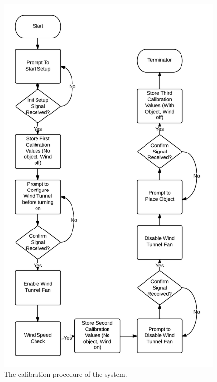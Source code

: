 	\begin{figure}[H]
		\centering
			\includegraphics[scale=0.20]{img/flowchart-calibration}
		\caption{The calibration procedure of the system.}
	\end{figure}
